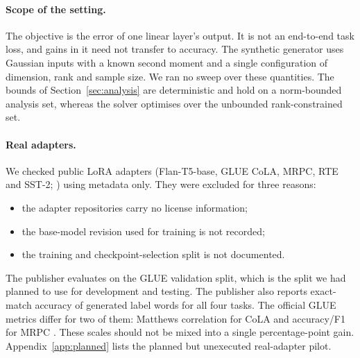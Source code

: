 \paragraph{Scope of the setting.} The objective is the error of one linear layer's output. It is
not an end-to-end task loss, and gains in it need not transfer to accuracy. The synthetic
generator uses Gaussian inputs with a known second moment and a single configuration of dimension,
rank and sample size. We ran no sweep over these quantities. The bounds of
Section~\ref{sec:analysis} are deterministic and hold on a norm-bounded analysis set, whereas the
solver optimises over the unbounded rank-constrained set.

\paragraph{Real adapters.} We checked \AdmNAdapters{} public LoRA adapters (Flan-T5-base, GLUE CoLA, MRPC,
RTE and SST-2; \citealp{chung2022flan,tang2024fusionbench}) using metadata only. They were excluded
for three reasons:
\begin{itemize}
\item the adapter repositories carry no license information;
\item the base-model revision used for training is not recorded;
\item the training and checkpoint-selection split is not documented.
\end{itemize}
The publisher evaluates on the GLUE validation split, which is the split we had planned to use for
development and testing. The publisher also reports exact-match accuracy of generated label words
for all four tasks. The official GLUE metrics differ for two of them: Matthews correlation for
CoLA and accuracy/F1 for MRPC \citep{wang2018glue}. These scales should not be
mixed into a single percentage-point gain. Appendix~\ref{app:planned} lists the planned but
unexecuted real-adapter pilot.

